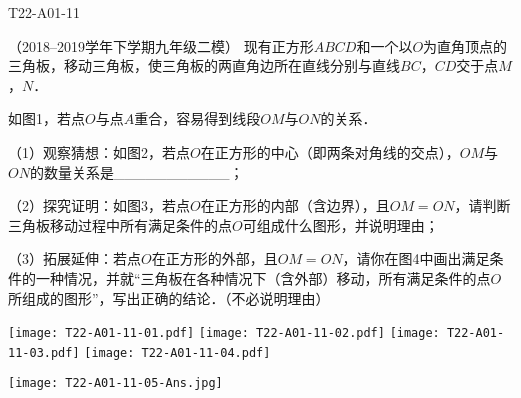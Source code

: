 \begin{defproblem}{T22-A01-11}%
\begin{onlyproblem}%
（2018--2019学年下学期九年级二模）
现有正方形$ABCD$和一个以$O$为直角顶点的三角板，移动三角板，使三角板的两直角边所在直线分别与直线$BC$，$CD$交于点$M$，$N$．

如图1，若点$O$与点$A$重合，容易得到线段$OM$与$ON$的关系．

（1）观察猜想：如图2，若点$O$在正方形的中心（即两条对角线的交点），$OM$与$ON$的数量关系是{\_}{\_}{\_}{\_}{\_}{\_}{\_}{\_}{\_}{\_}{\_}；

（2）探究证明：如图3，若点$O$在正方形的内部（含边界），且$OM=ON$，请判断三角板移动过程中所有满足条件的点$O$可组成什么图形，并说明理由；

（3）拓展延伸：若点$O$在正方形的外部，且$OM=ON$，请你在图4中画出满足条件的一种情况，并就``三角板在各种情况下（含外部）移动，所有满足条件的点$O$所组成的图形''，写出正确的结论．（不必说明理由）



\begin{center}
\texttt{[image: T22-A01-11-01.pdf]}\qquad
\texttt{[image: T22-A01-11-02.pdf]}\qquad
\texttt{[image: T22-A01-11-03.pdf]}\qquad
\texttt{[image: T22-A01-11-04.pdf]}
\end{center}



\end{onlyproblem}%
\begin{onlysolution}%
\begin{center}
\texttt{[image: T22-A01-11-05-Ans.jpg]}
\end{center}
\end{onlysolution}%
\end{defproblem}





